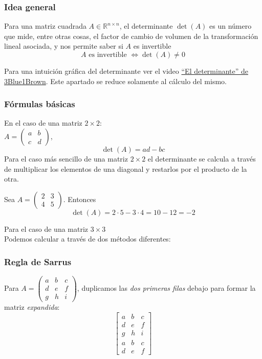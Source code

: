 \documentclass{article}
\begin{document}
\subsubsection*{Idea general}
Para una matriz cuadrada \(A\in\mathbb R^{n\times n}\), el determinante \(\det(A)\) es un número que mide, entre otras cosas, el {\color{teal}factor de cambio de volumen} de la transformación lineal asociada, y nos permite saber si \(A\) es invertible
\[
A \text{ es invertible } \Longleftrightarrow \det(A)\neq 0
\]

Para una intuición gráfica del determinante ver el video \href{https://www.youtube.com/watch?v=yt3eoYvGel0}{``El determinante'' de 3Blue1Brown}. Este apartado se reduce solamente al cálculo del mismo.
\subsubsection*{Fórmulas básicas}
En el caso de una matriz \(2\times 2\):
\\
\(A=\begin{pmatrix}a&b\\ c&d\end{pmatrix}\),
\[
\det(A)=ad-bc
\]
Para el caso más sencillo de una matriz \(2\times 2\) el determinante se calcula a través de multiplicar los elementos de una diagonal y restarlos por el producto de la otra.

Sea $A=\begin{pmatrix}2&3\\ 4&5\end{pmatrix}$. Entonces
\[
\det(A)=2\cdot5-3\cdot4=10-12=-2
\]


Para el caso de una matriz $3\times 3$ \\
Podemos calcular a través de dos métodos diferentes:
\subsubsection*{Regla de Sarrus}
Para \(A=\begin{pmatrix}a&b&c\\ d&e&f\\ g&h&i\end{pmatrix}\), duplicamos las \emph{dos primeras filas} debajo para formar la matriz \emph{expandida}:
\[
\left[
\begin{array}{ccc}
a & b & c\\
d & e & f\\
g & h & i\\
a & b & c\\
d & e & f
\end{array}
\right]
\]
\end{document}
